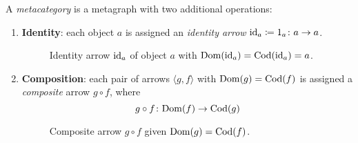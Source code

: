 \begin{definition}[Metacategory]
    A \textit{metacategory} is a metagraph with two additional operations:
    \begin{enumerate}
        \item \textbf{Identity}: each object $a$ is assigned an \textit{identity arrow} $\mathrm{id}_a \coloneqq 1_a \colon a \to a$.
        \begin{figure}[H]
            \centering
            \caption{Identity arrow $\mathrm{id}_a$ of object $a$ with $\mathrm{Dom}(\mathrm{id}_a) = \mathrm{Cod}(\mathrm{id}_a) = a$.}
            \label{fig:identity-arrow}
        \end{figure}
        \item \textbf{Composition}: each pair of arrows $\langle g, f \rangle$ with $\mathrm{Dom}(g) = \mathrm{Cod}(f)$ is assigned a \textit{composite} arrow $g \circ f$, where
        \begin{equation}
            g \circ f \colon \mathrm{Dom}(f) \to \mathrm{Cod}(g)
        \end{equation}
        \begin{figure}[H]
            \centering
            \caption{Composite arrow $g \circ f$ given $\mathrm{Dom}(g) = \mathrm{Cod}(f)$.}
            \label{fig:composite-arrow}
        \end{figure}
    \end{enumerate}
    

\end{definition}
